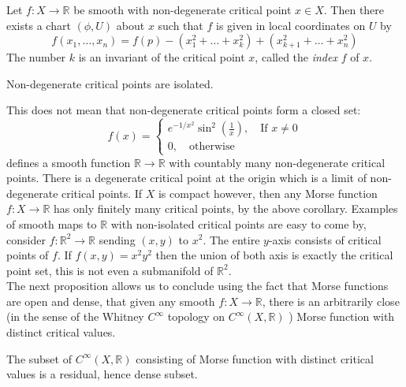 \documentclass[12pt]{article}
\newcommand{\RR}{\mathbb{R}}
\begin{document}
\begin{lemma} 
    Let $f: X \to \RR$ be smooth with non-degenerate critical point $x\in X$. Then there exists a chart $(\phi, U)$ about $x$ such that $f$ is given in local coordinates on $U$ by 
    $$
    f(x_1, \dots, x_n) = f(p) - (x_1^2 + \dots + x_k^2) + (x_{k+1}^2 + \dots + x_n^2)
    $$
    The number $k$ is an invariant of the critical point $x$, called the \emph{index} $f$ of $x$. 
\end{lemma}



\begin{corollary}
    Non-degenerate critical points are isolated. 
\end{corollary}

This does not mean that non-degenerate critical points form a closed set:
$$
f(x) = 
\begin{cases} 
      e^{-1/x^2} \sin^2(\frac{1}{x}) , \quad \text{If } x \neq 0 \\
      0, \quad \text{otherwise}
\end{cases}
$$
defines a smooth function $\RR \to \RR$ with countably many non-degenerate critical points. There is a degenerate critical point at the origin which is a limit of non-degenerate critical points. If $X$ is compact however, then any Morse function $f: X \to \RR$ has only finitely many critical points, by the above corollary. Examples of smooth maps to $\RR$ with non-isolated critical points are easy to come by, consider $f: \RR^2 \to \RR$ sending $(x, y)$ to $x^2$. The entire $y$-axis consists of critical points of $f$. If $f(x, y) = x^2 y^2$ then the union of both axis is exactly the critical point set, this is not even a submanifold of $\RR^2$. \\

The next proposition allows us to conclude using the fact that Morse functions are open and dense, that given any smooth $f: X \to \RR$, there is an arbitrarily close (in the sense of the Whitney $C^\infty$ topology on $C^\infty(X, \RR)$ ) Morse function with distinct critical values. 

\begin{proposition}
    The subset of $C^\infty(X, \RR)$ consisting of Morse function with distinct critical values is a residual, hence dense subset. 
\end{proposition}
\end{document}
